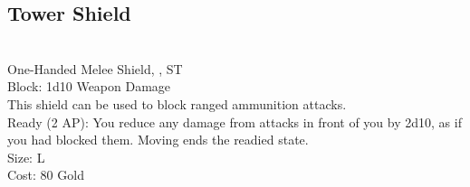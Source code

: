 \subsection{Tower Shield}\label{weapon:towerShield}\\
One-Handed Melee Shield, , ST\\
Block: 1d10 Weapon Damage\\
This shield can be used to block ranged ammunition attacks.\\
Ready (2 AP): You reduce any damage from attacks in front of you by 2d10, as if you had blocked them.
Moving ends the readied state.\\
Size: L\\
Cost: 80 Gold\\